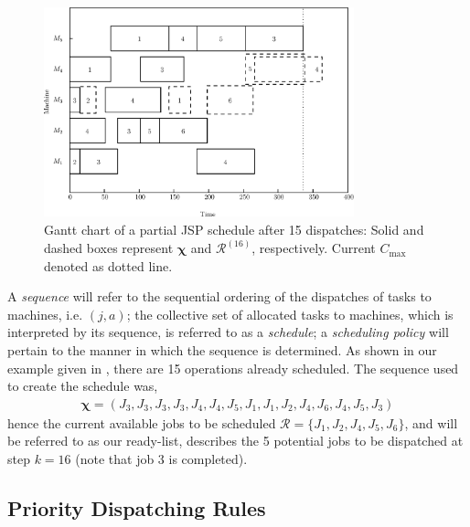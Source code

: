 \documentclass[smallextended]{svjour3}
\renewcommand{\vchi}{\bm \chi}
\begin{document}
	\begin{figure}[t!]\centering 
		\includegraphics[width=0.8\textwidth]{figures/jssp_example_nocolor.eps}
		\caption[Gantt chart of a partial JSP schedule]{Gantt chart of a partial JSP schedule after 15 dispatches: Solid and dashed boxes represent $\vchi$ and $\mathcal{R}^{(16)}$, respectively. Current $C_{\max}$ denoted as dotted line.}
		\label{fig:jssp:example}
	\end{figure}
	
	
	A \emph{sequence} will refer to the sequential ordering of the dispatches of tasks to machines, i.e. $(j,a)$; the collective set of allocated tasks to machines, which is interpreted by its sequence, is referred to as a \emph{schedule}; a \emph{scheduling policy} will pertain to the manner in which the sequence is determined.
	As shown in our example given in , there are 15 operations already scheduled. The sequence used to create the schedule was,
	\begin{eqnarray}
	\vchi=\left(J_3,J_3,J_3,J_3,J_4,J_4,J_5,J_1,J_1,J_2,J_4,J_6,J_4,J_5,J_3\right)
	\end{eqnarray}
	hence the current available jobs to be scheduled $\mathcal{R}=\{J_1,J_2,J_4,J_5,J_6\}$, and will be referred to as our ready-list, describes the 5 potential jobs to be dispatched at step $k=16$ (note that job 3 is completed).
	
	
	\subsection{Priority Dispatching Rules}
	
	
\end{document}
